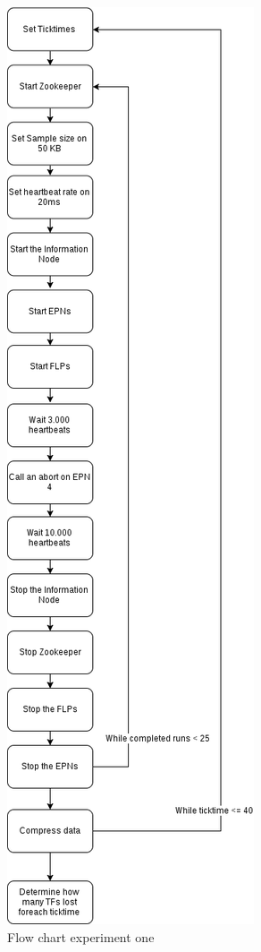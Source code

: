 \begin{figure}
    \centering
    \includegraphics[scale=0.3]{./graphics/ex1.png}
    \caption{Flow chart experiment one}
    \label{fig:FlowChart1}
\end{figure}


